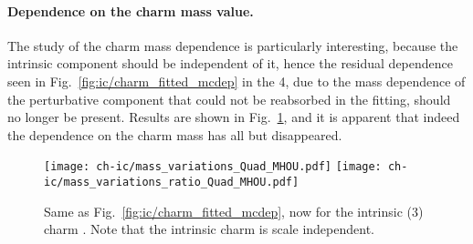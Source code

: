 \paragraph{Dependence on the charm mass value.}
%
The study of the charm mass dependence is particularly interesting,
because the intrinsic component should be independent of it, hence the
residual dependence seen in Fig.~\ref{fig:ic/charm_fitted_mcdep} in the
4\fns, due to the mass dependence of the perturbative component that
could not be reabsorbed in the fitting, should no longer be present. 
Results are shown in
Fig.~\ref{fig:ic/mass_variations_Quad_MHOU}, and it is apparent that
indeed the dependence on the charm mass has all but disappeared.


\begin{figure}[h]
  \begin{center}
\texttt{[image: ch-ic/mass\_variations\_Quad\_MHOU.pdf]}
    \texttt{[image: ch-ic/mass\_variations\_ratio\_Quad\_MHOU.pdf]}
\caption{\small      
 Same as Fig.~\ref{fig:ic/charm_fitted_mcdep}, now for
      the intrinsic (3\fns) charm \pdf. Note that the intrinsic charm
      \pdf is scale independent.
  \label{fig:ic/mass_variations_Quad_MHOU} }
\end{center}
\end{figure}
